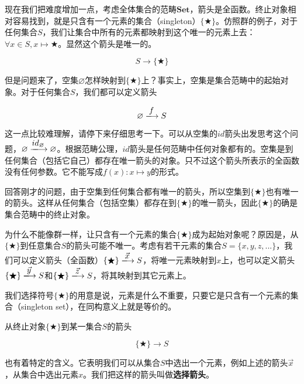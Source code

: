 \documentclass{article}
\begin{document}
\begin{example}
现在我们把难度增加一点，考虑全体集合的范畴$\pmb{Set}$，箭头是全函数。终止对象相对容易找到，就是只含有一个元素的集合（singleton）$\{ \bigstar \}$。仿照群的例子，对于任何集合$S$，我们让集合中所有的元素都映射到这个唯一的元素上去：$\forall x \in S, x \mapsto \bigstar$。显然这个箭头是唯一的。

\[
  S \longrightarrow \{ \bigstar \}
\]

但是问题来了，空集$\varnothing$怎样映射到$\{ \bigstar \}$上？事实上，空集是集合范畴中的起始对象。对于任何集合$S$，我们都可以定义箭头

\[
  \varnothing \arrowto{f} S
\]

这一点比较难理解，请停下来仔细思考一下。可以从空集的$id$箭头出发思考这个问题，$\varnothing \arrowto{id_{\varnothing}} \varnothing$。根据范畴公理，$id$箭头是任何范畴中任何对象都有的。空集是到任何集合（包括它自己）都存在唯一箭头的对象。只不过这个箭头所表示的全函数没有任何参数。它不能写成$f(x): x \mapsto y$的形式。

回答刚才的问题，由于空集到任何集合都有唯一的箭头，所以空集到$\{ \bigstar \}$也有唯一的箭头。这样从任何集合（包括空集）都存在到$\{ \bigstar \}$的唯一箭头，因此$\{ \bigstar \}$的确是集合范畴中的终止对象。

为什么不能像群一样，让只含有一个元素的集合$\{ \bigstar \}$成为起始对象呢？原因是，从$\{ \bigstar \}$到任意集合$S$的箭头可能不唯一。考虑有若干元素的集合$S = \{x, y, z, ...\}$，我们可以定义箭头（全函数）$\{ \bigstar \} \arrowto{\vec{x}} S$，将唯一元素映射到$x$上，也可以定义箭头$\{ \bigstar \} \arrowto{\vec{y}} S$和$\{ \bigstar \} \arrowto{\vec{z}} S$，将其映射到其它元素上。

我们选择符号$\{ \bigstar \}$的用意是说，元素是什么不重要，只要它是只含有一个元素的集合（singleton set），在同构意义上就是等价的。

\label{sec:selection-arrow} 
从终止对象$\{ \bigstar \}$到某一集合$S$的箭头

\[
  \{ \bigstar \} \longrightarrow S
\]

也有着特定的含义。它表明我们可以从集合$S$中选出一个元素，例如上述的箭头$\vec{x}$，从集合中选出元素$x$。我们把这样的箭头叫做\textbf{选择箭头}。
\end{example}
\end{document}
